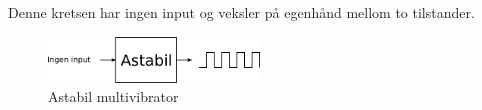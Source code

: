 Denne kretsen har ingen input og veksler på egenhånd mellom to tilstander.

\begin{figure}[H]
  \centering
  \includegraphics[width=0.5\textwidth]{./img/astabil}
  \caption{Astabil multivibrator}
\end{figure}

